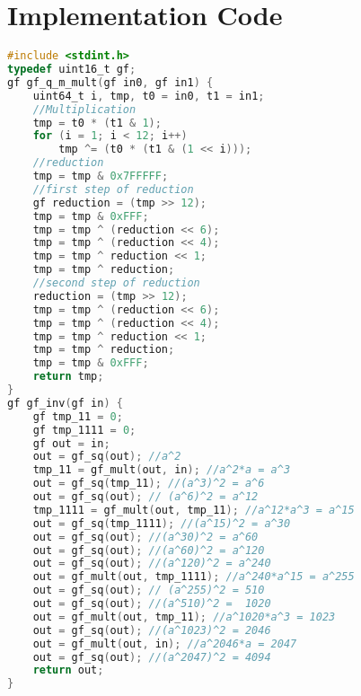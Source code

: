 \documentclass[brazil, english]{ufsc-thesis}
\begin{document}
\postextual


\appendix
\section{Implementation Code}

\begin{center}
\begin{adjustbox}{width=\textwidth,height=\someheight,keepaspectratio}
\begin{lstlisting}[caption={Multiplication of two elements in $\mathbb{F}_{2^{12}}$ and inversion of an element in $\mathbb{F}_{2^{12}}$},label={lst:label},language=C]
#include <stdint.h>
typedef uint16_t gf;
gf gf_q_m_mult(gf in0, gf in1) {
    uint64_t i, tmp, t0 = in0, t1 = in1;
    //Multiplication
    tmp = t0 * (t1 & 1);
    for (i = 1; i < 12; i++)
        tmp ^= (t0 * (t1 & (1 << i)));
    //reduction
    tmp = tmp & 0x7FFFFF;
    //first step of reduction
    gf reduction = (tmp >> 12);
    tmp = tmp & 0xFFF;
    tmp = tmp ^ (reduction << 6);
    tmp = tmp ^ (reduction << 4);
    tmp = tmp ^ reduction << 1;
    tmp = tmp ^ reduction;
    //second step of reduction
    reduction = (tmp >> 12);
    tmp = tmp ^ (reduction << 6);
    tmp = tmp ^ (reduction << 4);
    tmp = tmp ^ reduction << 1;
    tmp = tmp ^ reduction;
    tmp = tmp & 0xFFF;
    return tmp;
}
gf gf_inv(gf in) {
    gf tmp_11 = 0;
    gf tmp_1111 = 0;
    gf out = in;
    out = gf_sq(out); //a^2
    tmp_11 = gf_mult(out, in); //a^2*a = a^3
    out = gf_sq(tmp_11); //(a^3)^2 = a^6
    out = gf_sq(out); // (a^6)^2 = a^12
    tmp_1111 = gf_mult(out, tmp_11); //a^12*a^3 = a^15
    out = gf_sq(tmp_1111); //(a^15)^2 = a^30
    out = gf_sq(out); //(a^30)^2 = a^60
    out = gf_sq(out); //(a^60)^2 = a^120
    out = gf_sq(out); //(a^120)^2 = a^240
    out = gf_mult(out, tmp_1111); //a^240*a^15 = a^255
    out = gf_sq(out); // (a^255)^2 = 510
    out = gf_sq(out); //(a^510)^2 =  1020
    out = gf_mult(out, tmp_11); //a^1020*a^3 = 1023
    out = gf_sq(out); //(a^1023)^2 = 2046
    out = gf_mult(out, in); //a^2046*a = 2047
    out = gf_sq(out); //(a^2047)^2 = 4094
    return out;
}
\end{lstlisting}
\end{adjustbox}
\end{center}
\end{document}
